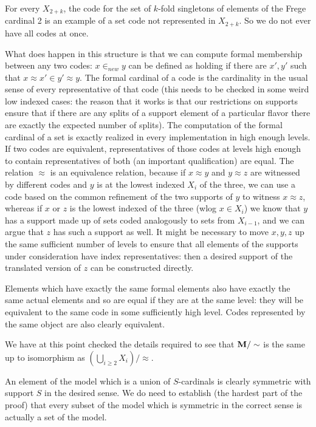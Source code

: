 \documentclass{article}
\begin{document}
\begin{description}
For every $X_{2+k}$, the code for the set of $k$-fold singletons of elements of the Frege cardinal 2 is an example of a set code not represented in $X_{2+k}$.  So we do not ever have all codes at once.

What does happen in this structure is that we can compute formal membership between any two codes:  $x \in_{new} y$ can be defined as holding if there are $x',y'$ such that
$x \approx x' \in y' \approx y$.  The formal cardinal of a code is the cardinality in the usual sense of every representative of that code (this needs to be checked in some weird low indexed cases:  the reason that it works is that our restrictions on supports ensure that if there are any splits of a support element of a particular flavor there are exactly the expected number of splits).
The computation of the formal cardinal of a set is exactly realized in every implementation in high enough levels.  If two codes are equivalent, representatives of those codes at levels high enough to contain representatives of both (an important qualification) are equal.   The relation $\approx$ is an equivalence relation, because if $x \approx y$ and $y \approx z$ are witnessed by different codes
and $y$ is at the lowest indexed $X_i$ of the three, we can use a code based on the common refinement of the two supports of $y$ to witness $x \approx z$, whereas if
$x$ or $z$ is the lowest indexed of the three (wlog $x \in X_i$) we know that $y$ has a support made up of sets coded analogously to sets from $X_{i-1}$, and we can argue that $z$ has such a support as well.  It might be necessary to move $x,y,z$ up the same sufficient number of levels to ensure that all elements of the supports under consideration have index representatives:  then a desired
support of the translated version of $z$ can be constructed directly.

Elements which have exactly the same formal elements also have exactly the same actual elements and so are equal if they are at the same level:  they will be equivalent to the same
code in some sufficiently high level.  Codes represented by the same object are also clearly equivalent.

We have at this point checked the details required to see that ${\bf M} / \sim$ is the same up to isomorphism as $(\bigcup _{i \geq 2}X_i)/\approx$.

An element of the model which is a union of $S$-cardinals is clearly  symmetric with support $S$ in the desired sense.  We do need to establish (the hardest part of the proof) that
every subset of the model which is symmetric in the correct sense is actually a set of the model.




\end{description}
\end{document}
